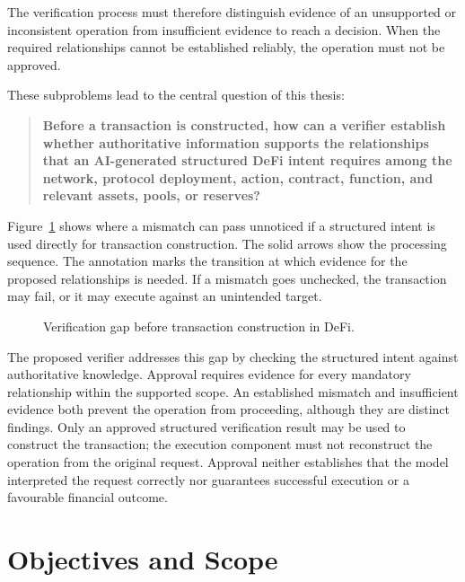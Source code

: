 The verification process must therefore distinguish evidence of an
unsupported or inconsistent operation from insufficient evidence to
reach a decision. When the required relationships cannot be established
reliably, the operation must not be approved.


These subproblems lead to the central question of this thesis:

\begin{quote}
\textbf{Before a transaction is constructed, how can a verifier establish
whether authoritative information supports the relationships that an
AI-generated structured DeFi intent requires among the network, protocol
deployment, action, contract, function, and relevant assets, pools, or
reserves?}
\end{quote}

Figure~\ref{fig:problem_statement_overview} shows where a mismatch can
pass unnoticed if a structured intent is used directly for transaction
construction. The solid arrows show the processing sequence. The
annotation marks the transition at which evidence for the proposed
relationships is needed. If a mismatch goes unchecked, the transaction
may fail, or it may execute against an unintended target.

\begin{figure}[H]
    \centering
    
    \caption[Verification gap before transaction construction]{Verification gap before transaction construction in DeFi.}
    \label{fig:problem_statement_overview}
\end{figure}

The proposed verifier addresses this gap by checking the structured intent
against authoritative knowledge. Approval requires evidence for every
mandatory relationship within the supported scope. An established
mismatch and insufficient evidence both prevent the operation from
proceeding, although they are distinct findings. Only an approved
structured verification result may be used to construct the transaction;
the execution component must not reconstruct the operation from the
original request. Approval neither establishes that the model interpreted
the request correctly nor guarantees successful execution or a favourable
financial outcome.


\section{Objectives and Scope}
\label{sec:objectives_scope}

